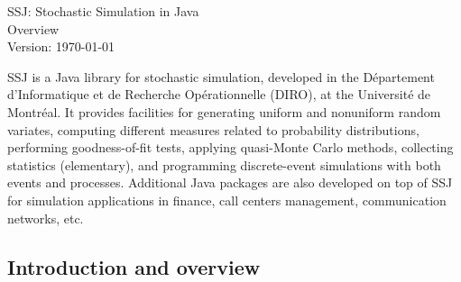 \documentclass[12pt]{article}
\begin{document}
\begin{titlepage}

\null\vfill
\begin {center}
{\Large SSJ: Stochastic Simulation in Java}\\[15pt]
{\Large Overview} \\[20pt]
 Version: \today \\
\vfill
\end {center}

SSJ is a Java library for stochastic simulation, developed in the 
D\'epartement d'Informa\-tique et de Recherche
Op\'erationnelle (DIRO), at the Universit\'e de Montr\'eal.
It provides facilities for generating uniform and nonuniform random 
variates, computing different measures related to probability 
distributions, performing goodness-of-fit tests, applying 
quasi-Monte Carlo methods, collecting statistics (elementary),
and programming discrete-event simulations with both events and processes.
Additional Java packages are also developed on top of SSJ for simulation
applications in finance, call centers management, communication networks,
 etc.
\bigskip


\begin{center}
\end{center}
\vfill
\end{titlepage}

\subsection*{Introduction and overview}
\end{document}
